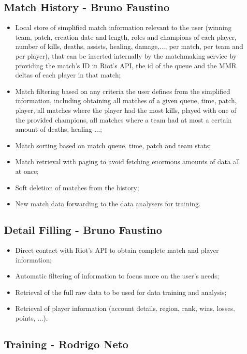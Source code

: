 \documentclass[11pt,a4paper]{article}
\begin{document}
 \subsection{Match History - Bruno Faustino}

 \begin{itemize}
  \item Local store of simplified match information relevant to the user (winning team, patch, creation date and length, roles and champions of each player, number of kills, deaths, assists, healing, damage,..., per match, per team and per player), that can be inserted internally by the matchmaking service by providing the match's ID in Riot's API, the id of the queue and the MMR deltas of each player in that match;
  \item Match filtering based on any criteria the user defines from the simplified information, including obtaining all matches of a given queue, time, patch, player, all matches where the player had the most kills, played with one of the provided champions, all matches where a team had at most a certain amount of deaths, healing ...;
  \item Match sorting based on match queue, time, patch and team stats;
  \item Match retrieval with paging to avoid fetching enormous amounts of data all at once;
  \item Soft deletion of matches from the history;
  \item New match data forwarding to the data analysers for training.
 \end{itemize}

 \subsection{Detail Filling - Bruno Faustino}

 \begin{itemize}
  \item Direct contact with Riot's API to obtain complete match and player information;
  \item Automatic filtering of information to focus more on the user's needs;
  \item Retrieval of the full raw data to be used for data training and analysis;
  \item Retrieval of player information (account details, region, rank, wins, losses, points, ...).
 \end{itemize}
 
 \subsection{Training - Rodrigo Neto}
\end{document}
